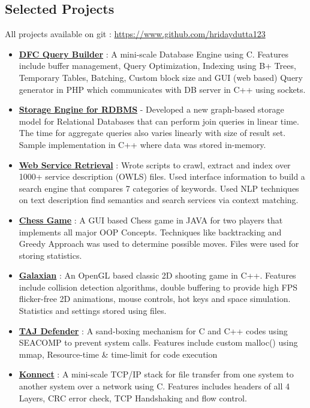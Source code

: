 \documentclass[margin, centered]{res}
\begin{document}
\begin{resume}
\section{Selected Projects}
All projects available on git : \url{https://www.github.com/hridaydutta123}
\begin{itemize}[leftmargin=*]
 \item \textbf{\href{https://github.com/Bug-Assassins/DFC_query_builder}{DFC Query Builder}} : A mini-scale Database Engine using C. Features include buffer management, Query Optimization, Indexing using B+ Trees, Temporary Tables, Batching, Custom block size and GUI (web based) Query generator in PHP which communicates with DB server in C++ using sockets.
 \item \textbf{\href{https://github.com/Bug-Assassins/Relational-Graph-Database}{Storage Engine for RDBMS}} - Developed a new graph-based storage model for Relational Databases that can perform join queries in linear time. The time for aggregate queries also varies linearly with size of result set. Sample implementation in C++ where data was stored in-memory.
 \item \textbf{\href{https://github.com/Bug-Assassins/web_service_retrieval}{Web Service Retrieval}} : Wrote scripts to crawl, extract and index over 1000+ service description (OWLS) files. Used interface information to build a search engine that compares 7 categories of keywords. Used NLP techniques on text description find semantics and search services via context matching.
 \item \textbf{\href{https://github.com/ashish1294/ChessOOP}{Chess Game}} : A GUI based Chess game in JAVA for two players that implements all major OOP Concepts. Techniques like backtracking and Greedy Approach was used to determine possible moves. Files were used for storing statistics.
 \item \textbf{\href{https://github.com/Bug-Assassins/Galaxian}{Galaxian}} : An OpenGL based classic 2D shooting game in C++. Features include collision detection algorithms, double buffering to provide high FPS flicker-free 2D animations, mouse controls, hot keys and space simulation. Statistics and settings stored using files.
 \item \textbf{\href{https://github.com/Bug-Assassins/TAJ-Defender}{TAJ Defender}} : A sand-boxing mechanism for C and C++ codes using SEACOMP to prevent system calls. Features include custom malloc() using mmap, Resource-time \& time-limit for code execution
 \item \textbf{\href{https://github.com/Bug-Assassins/Konnect}{Konnect}} : A mini-scale TCP/IP stack for file transfer from one system to another system over a network using C. Features includes headers of all 4 Layers, CRC error check, TCP Handshaking and flow control.

\end{itemize}
\end{resume}
\end{document}
